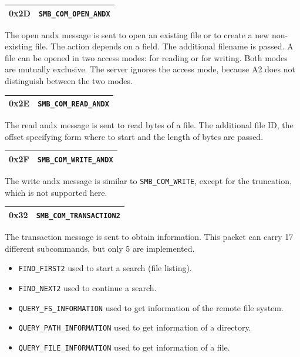 \documentclass[11pt,a4paper]{book}
\begin{document}
\begin{center}
\renewcommand{\tabcolsep}{5mm}
\begin{tabular}{p{3cm}p{8cm}}
0x2D & \texttt{SMB\_COM\_OPEN\_ANDX} \\
\hline
\end{tabular}
\end{center}
The open andx message is sent to open an existing file or to create a new non-existing file. The action depends on a field. The additional filename is passed. A file can be opened in two access modes: for reading or for writing. Both modes are mutually exclusive. The server ignores the access mode, because A2 does not distinguish between the two modes.

\begin{center}
\renewcommand{\tabcolsep}{5mm}
\begin{tabular}{p{3cm}p{8cm}}
0x2E & \texttt{SMB\_COM\_READ\_ANDX} \\
\hline
\end{tabular}
\end{center}
The read andx message is sent to read bytes of a file. The additional file ID, the offset specifying form where to start and the length of bytes are passed. 

\begin{center}
\renewcommand{\tabcolsep}{5mm}
\begin{tabular}{p{3cm}p{8cm}}
0x2F & \texttt{SMB\_COM\_WRITE\_ANDX} \\
\hline
\end{tabular}
\end{center}
The write andx message is similar to \texttt{SMB\_COM\_WRITE}, except for the truncation, which is not supported here.

\begin{flushleft}
\begin{center}
\renewcommand{\tabcolsep}{5mm}
\begin{tabular}{p{3cm}p{8cm}}
0x32 & \texttt{SMB\_COM\_TRANSACTION2} \\
\hline
\end{tabular}
\end{center}
The transaction message is sent to obtain information. This packet can carry 17 different subcommands, but only 5 are implemented.
\begin{itemize}
\item \texttt{FIND\_FIRST2} used to start a search (file listing).
\item \texttt{FIND\_NEXT2} used to continue a search.
\item \texttt{QUERY\_FS\_INFORMATION} used to get information of the remote file system.
\item \texttt{QUERY\_PATH\_INFORMATION} used to get information of a directory.
\item \texttt{QUERY\_FILE\_INFORMATION} used to get information of a file.
\end{itemize}
\end{flushleft}
\end{document}
